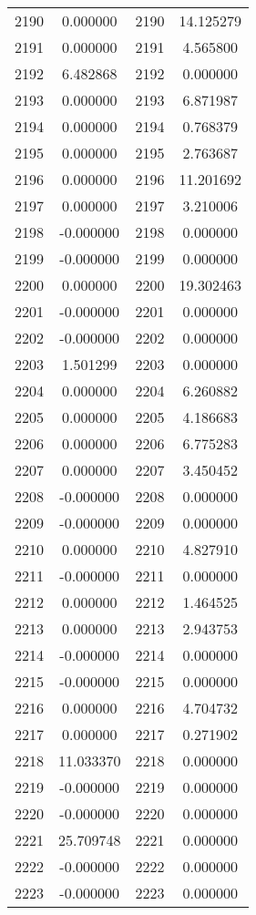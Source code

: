 \documentclass[12pt]{article}
\begin{document}
\begin{longtable}{@{}cccc@{}}
2190 & 0.000000 & 2190 & 14.125279 \\
2191 & 0.000000 & 2191 & 4.565800 \\
2192 & 6.482868 & 2192 & 0.000000 \\
2193 & 0.000000 & 2193 & 6.871987 \\
2194 & 0.000000 & 2194 & 0.768379 \\
2195 & 0.000000 & 2195 & 2.763687 \\
2196 & 0.000000 & 2196 & 11.201692 \\
2197 & 0.000000 & 2197 & 3.210006 \\
2198 & -0.000000 & 2198 & 0.000000 \\
2199 & -0.000000 & 2199 & 0.000000 \\
2200 & 0.000000 & 2200 & 19.302463 \\
2201 & -0.000000 & 2201 & 0.000000 \\
2202 & -0.000000 & 2202 & 0.000000 \\
2203 & 1.501299 & 2203 & 0.000000 \\
2204 & 0.000000 & 2204 & 6.260882 \\
2205 & 0.000000 & 2205 & 4.186683 \\
2206 & 0.000000 & 2206 & 6.775283 \\
2207 & 0.000000 & 2207 & 3.450452 \\
2208 & -0.000000 & 2208 & 0.000000 \\
2209 & -0.000000 & 2209 & 0.000000 \\
2210 & 0.000000 & 2210 & 4.827910 \\
2211 & -0.000000 & 2211 & 0.000000 \\
2212 & 0.000000 & 2212 & 1.464525 \\
2213 & 0.000000 & 2213 & 2.943753 \\
2214 & -0.000000 & 2214 & 0.000000 \\
2215 & -0.000000 & 2215 & 0.000000 \\
2216 & 0.000000 & 2216 & 4.704732 \\
2217 & 0.000000 & 2217 & 0.271902 \\
2218 & 11.033370 & 2218 & 0.000000 \\
2219 & -0.000000 & 2219 & 0.000000 \\
2220 & -0.000000 & 2220 & 0.000000 \\
2221 & 25.709748 & 2221 & 0.000000 \\
2222 & -0.000000 & 2222 & 0.000000 \\
2223 & -0.000000 & 2223 & 0.000000 \\

\end{longtable}
\end{document}
